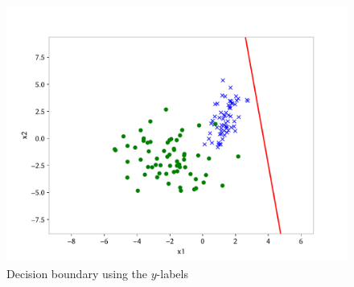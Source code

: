 \begin{answer}
\begin{figure}[h]
    \centering
    \includegraphics*[width=.7\linewidth]{../src/posonly/part_b.pdf}
    \caption{Decision boundary using the $y$-labels}        
\end{figure}
\end{answer}
